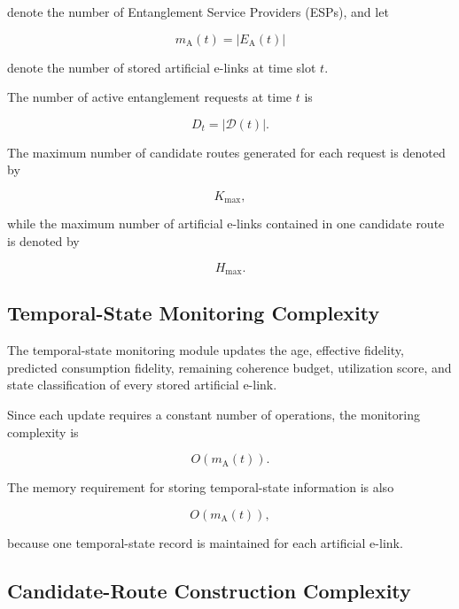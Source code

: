 denote the number of Entanglement Service Providers (ESPs), and let

\begin{equation}
    m_{\mathrm{A}}(t)
    =
    |E_{\mathrm{A}}(t)|
\end{equation}

denote the number of stored artificial e-links at time slot $t$.

The number of active entanglement requests at time $t$ is

\begin{equation}
    D_t
    =
    |\mathcal{D}(t)|.
\end{equation}

The maximum number of candidate routes generated for each request is denoted by

\begin{equation}
    K_{\max},
\end{equation}

while the maximum number of artificial e-links contained in one candidate route is denoted by

\begin{equation}
    H_{\max}.
\end{equation}


\subsection{Temporal-State Monitoring Complexity}

The temporal-state monitoring module updates the age, effective fidelity, predicted consumption fidelity, remaining coherence budget, utilization score, and state classification of every stored artificial e-link.

Since each update requires a constant number of operations, the monitoring complexity is

\begin{equation}
    O
    \left(
    m_{\mathrm{A}}(t)
    \right).
\end{equation}

The memory requirement for storing temporal-state information is also

\begin{equation}
    O
    \left(
    m_{\mathrm{A}}(t)
    \right),
\end{equation}

because one temporal-state record is maintained for each artificial e-link.


\subsection{Candidate-Route Construction Complexity}

